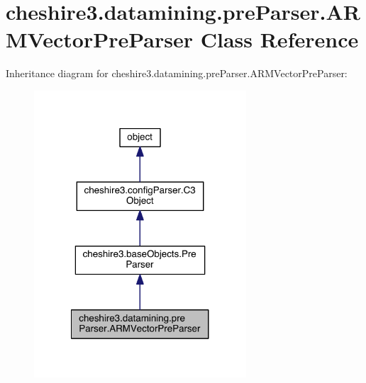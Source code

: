 \hypertarget{classcheshire3_1_1datamining_1_1pre_parser_1_1_a_r_m_vector_pre_parser}{\section{cheshire3.\-datamining.\-pre\-Parser.\-A\-R\-M\-Vector\-Pre\-Parser Class Reference}
\label{classcheshire3_1_1datamining_1_1pre_parser_1_1_a_r_m_vector_pre_parser}
}


Inheritance diagram for cheshire3.\-datamining.\-pre\-Parser.\-A\-R\-M\-Vector\-Pre\-Parser\-:
\nopagebreak
\begin{figure}[H]
\begin{center}
\leavevmode
\includegraphics[width=224pt]{classcheshire3_1_1datamining_1_1pre_parser_1_1_a_r_m_vector_pre_parser__inherit__graph}
\end{center}
\end{figure}


